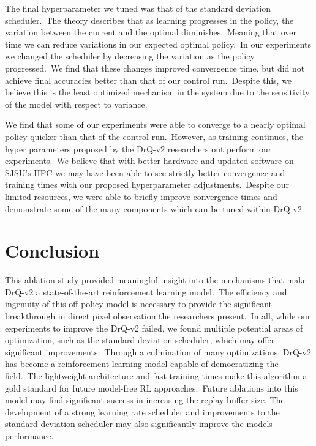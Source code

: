\documentclass[conference]{./IEEEtran/IEEEtran} %
\begin{document}
    The final hyperparameter we tuned was that of the standard deviation scheduler.\ The theory describes that as learning
    progresses in the policy, the variation between the current and the optimal diminishes.\ Meaning that over time we can reduce
    variations in our expected optimal policy.\ In our experiments we changed the scheduler by decreasing the variation as the
    policy progressed.\  We find that these changes improved convergence time, but did not achieve final accuracies better than
    that of our control run.\ Despite this, we believe this is the least optimized mechanism in the system due to the sensitivity
    of the model with respect to variance.\

    We find that some of our experiments were able to converge to a nearly optimal policy quicker than that of the control run.\
    However, as training continues, the hyper parameters proposed by the DrQ-v2 researchers out perform our experiments.\ We believe
    that with better hardware and updated software on SJSU's HPC we may have been able to see strictly better convergence and
    training times with our proposed hyperparameter adjustments.\ Despite our limited resources, we were able to briefly improve
    convergence times and demonstrate some of the many components which can be tuned within DrQ-v2.\


    \section{Conclusion}\label{sec:conclusion}

    This ablation study provided meaningful insight into the mechanisms that make DrQ-v2 a state-of-the-art reinforcement learning
    model.\ The efficiency and ingenuity of this off-policy model is necessary to provide the significant breakthrough in direct
    pixel observation the researchers present.\ In all, while our experiments to improve the DrQ-v2 failed, we found multiple
    potential areas of optimization, such as the standard deviation scheduler, which may offer significant improvements.\ Through
    a culmination of many optimizations, DrQ-v2 has become a reinforcement learning model capable of democratizing the field.\
    The lightweight architecture and fast training times make this algorithm a gold standard for future model-free RL approaches.\
    Future ablations into this model may find significant success in increasing the replay buffer size. The development of a strong
    learning rate scheduler and improvements to the standard deviation scheduler may also significantly improve the models performance.\


    
    
\end{document}
